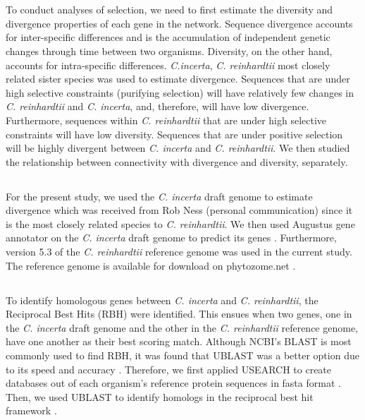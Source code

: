 \documentclass[letterpaper, 10 pt, conference]{ieeeconf}  %
\begin{document}
\section*{}

\setlength{\parindent}{10ex} To conduct analyses of selection, we need to first estimate the diversity and divergence properties of each gene in the network. Sequence divergence accounts for inter-specific differences and is the accumulation of independent genetic changes through time between two organisms. Diversity, on the other hand, accounts for intra-specific differences. \textit{C.incerta}, \textit{C. reinhardtii} most closely related sister species was used to estimate divergence. Sequences that are under high selective constraints (purifying selection) will have relatively few changes in \textit{C. reinhardtii} and \textit{C. incerta}, and, therefore, will have low divergence. Furthermore, sequences within \textit{C. reinhardtii} that are under high selective constraints will have low diversity.  Sequences that are under positive selection will be highly divergent between \textit{C. incerta} and \textit{C. reinhardtii}. We then studied the relationship between connectivity with divergence and diversity, separately. 


\subsection*{}
For the present study, we used the \textit{C. incerta} draft genome to estimate divergence which was received from Rob Ness (personal communication) since it is the most closely related species to \textit{C. reinhardtii}. We then used Augustus gene annotator on the \textit{C. incerta} draft genome to predict its genes \cite{sm05}. Furthermore, version 5.3 of the \textit{C. reinhardtii} reference genome was used in the current study. The reference genome is available for download on phytozome.net \cite{gshnhf}.

\subsection*{}
To identify homologous genes between \textit{C. incerta} and \textit{C. reinhardtii}, the Reciprocal Best Hits (RBH) were identified. This ensues when two genes, one in the \textit{C. incerta} draft genome and the other in the \textit{C. reinhardtii} reference genome, have one another as their best scoring match. Although NCBI’s BLAST is most commonly used to find RBH, it was found that UBLAST was a better option due to its speed and accuracy \cite{wm14}. Therefore, we first applied USEARCH to create databases out of each organism’s reference protein sequences in fasta format \cite{e10}. Then, we used UBLAST to identify homologs in the reciprocal best hit framework \cite{e10}.     
\end{document}
